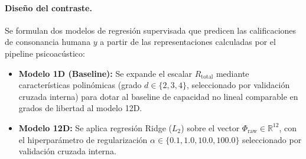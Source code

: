 \paragraph{Diseño del contraste.}
Se formulan dos modelos de regresión supervisada que predicen las calificaciones de consonancia humana $y$ a partir de las representaciones calculadas por el pipeline psicoacústico:
\begin{itemize}
\item \textbf{Modelo 1D (Baseline):} Se expande el escalar $R_{\text{total}}$ mediante características polinómicas (grado $d \in \{2, 3, 4\}$, seleccionado por validación cruzada interna) para dotar al baseline de capacidad no lineal comparable en grados de libertad al modelo 12D.
\item \textbf{Modelo 12D:} Se aplica regresión Ridge ($L_2$) sobre el vector $\Phi_{\text{raw}} \in \mathbb{R}^{12}$, con el hiperparámetro de regularización $\alpha \in \{0.1, 1.0, 10.0, 100.0\}$ seleccionado por validación cruzada interna.
\end{itemize}

